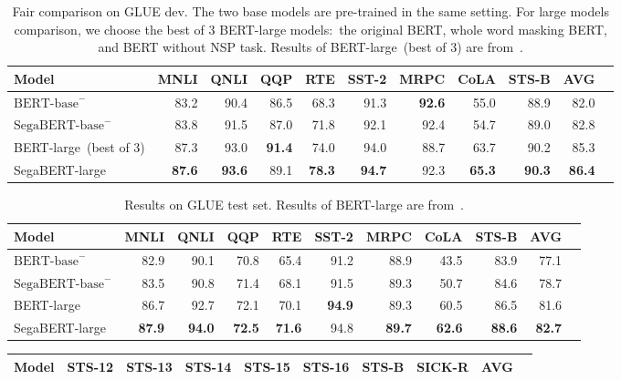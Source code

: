 \documentclass[letterpaper]{article}
\begin{document}
\begin{table*}[!htp]\centering
  \small
  \begin{tabular}{lrrrrrrrrrr}\toprule
    Model &MNLI &QNLI &QQP &RTE &SST-2 &MRPC &CoLA &STS-B &AVG \\\midrule
    $\text{BERT-base}^{-}$ &83.2 &90.4 &86.5 &68.3 &91.3 &\textbf{92.6} &55.0 &88.9 &82.0 \\
    $\text{SegaBERT-base}^{-}$ &83.8 &91.5 &87.0 &71.8 &92.1 &92.4 &54.7 &89.0 &82.8 \\
    BERT-large~(best of 3) &87.3 &93.0 &\textbf{91.4} &74.0 &94.0 &88.7 &63.7 &90.2 &85.3 \\
    SegaBERT-large &\textbf{87.6} &\textbf{93.6} &89.1 &\textbf{78.3} &\textbf{94.7} &92.3 &\textbf{65.3} &\textbf{90.3} &\textbf{86.4} \\
  \bottomrule
  \end{tabular}
  \caption{Fair comparison on GLUE dev. The two base models are pre-trained in the same setting. For large models comparison, we choose the best of 3 BERT-large models:\ the original BERT, whole word masking BERT, and BERT without NSP task. Results of BERT-large~(best of 3) are from~\citet{DBLP:conf/nips/XLNet}.}\label{tab: glue_fair}
  \end{table*} \begin{table*}[ht]\centering
  \small
  \begin{tabular}{lrrrrrrrrrr}\toprule
    Model &MNLI &QNLI &QQP &RTE &SST-2 &MRPC &CoLA &STS-B &AVG \\\midrule
    $\text{BERT-base}^{-}$ &82.9 &90.1 &70.8 &65.4 &91.2 &88.9 &43.5 &83.9 &77.1 \\
    $\text{SegaBERT-base}^{-}$ &83.5 &90.8 &71.4 &68.1 &91.5 &89.3 &50.7 &84.6 &78.7 \\
    BERT-large &86.7 &92.7 &72.1 &70.1 &\textbf{94.9} &89.3 &60.5 &86.5 &81.6 \\
    SegaBERT-large &\textbf{87.9} &\textbf{94.0} &\textbf{72.5} &\textbf{71.6} &94.8 &\textbf{89.7} &\textbf{62.6} &\textbf{88.6} &\textbf{82.7} \\
  \bottomrule
  \end{tabular}
  \caption{Results on GLUE test set. Results of BERT-large are from~\citet{DBLP:journals/corr/bert}.}\label{tab: glue_test}
  \end{table*} \begin{table*}[ht!]\centering
  \small
  \begin{tabular}{lrrrrrrrrr}\toprule
   Model&STS-12 &STS-13 &STS-14 &STS-15 &STS-16 &STS-B &SICK-R &AVG \\\midrule

\end{tabular}
\end{table*}
\end{document}
